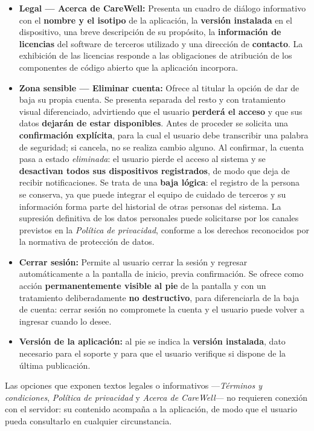 \documentclass[a4paper,12pt]{article}
\begin{document}
\begin{itemize}
        \item \textbf{Legal — Acerca de CareWell:} Presenta un cuadro de diálogo informativo con el \textbf{nombre y el isotipo} de la aplicación, la \textbf{versión instalada} en el dispositivo, una breve descripción de su propósito, la \textbf{información de licencias} del software de terceros utilizado y una dirección de \textbf{contacto}. La exhibición de las licencias responde a las obligaciones de atribución de los componentes de código abierto que la aplicación incorpora.
        \item \textbf{Zona sensible — Eliminar cuenta:} Ofrece al titular la opción de dar de baja su propia cuenta. Se presenta separada del resto y con tratamiento visual diferenciado, advirtiendo que el usuario \textbf{perderá el acceso} y que sus datos \textbf{dejarán de estar disponibles}. Antes de proceder se solicita una \textbf{confirmación explícita}, para la cual el usuario debe transcribir una palabra de seguridad; si cancela, no se realiza cambio alguno. Al confirmar, la cuenta pasa a estado \textit{eliminada}: el usuario pierde el acceso al sistema y se \textbf{desactivan todos sus dispositivos registrados}, de modo que deja de recibir notificaciones. Se trata de una \textbf{baja lógica}: el registro de la persona se conserva, ya que puede integrar el equipo de cuidado de terceros y su información forma parte del historial de otras personas del sistema. La supresión definitiva de los datos personales puede solicitarse por los canales previstos en la \textit{Política de privacidad}, conforme a los derechos reconocidos por la normativa de protección de datos.
        \item \textbf{Cerrar sesión:} Permite al usuario cerrar la sesión y regresar automáticamente a la pantalla de inicio, previa confirmación. Se ofrece como acción \textbf{permanentemente visible al pie} de la pantalla y con un tratamiento deliberadamente \textbf{no destructivo}, para diferenciarla de la baja de cuenta: cerrar sesión no compromete la cuenta y el usuario puede volver a ingresar cuando lo desee.
        \item \textbf{Versión de la aplicación:} al pie se indica la \textbf{versión instalada}, dato necesario para el soporte y para que el usuario verifique si dispone de la última publicación.
    \end{itemize}
    \par Las opciones que exponen textos legales o informativos —\textit{Términos y condiciones}, \textit{Política de privacidad} y \textit{Acerca de CareWell}— no requieren conexión con el servidor: su contenido acompaña a la aplicación, de modo que el usuario pueda consultarlo en cualquier circunstancia.
\end{document}
